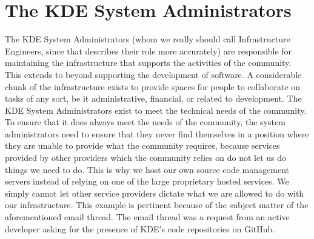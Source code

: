 \section*{The KDE System Administrators}
The KDE System Administrators (whom we really should call Infrastructure Engineers, since that describes their role more accurately) are responsible for maintaining the infrastructure that supports the activities of the community. This extends to beyond supporting the development of software. A considerable chunk of the infrastructure exists to provide spaces for people to collaborate on tasks of any sort, be it administrative, financial, or related to development. The KDE System Administrators exist to meet the technical needs of the community.
To ensure that it does always meet the needs of the community, the system administrators need to ensure that they never find themselves in a position where they are unable to provide what the community requires, because services provided by other providers which the community relies on do not let us do things we need to do. This is why we host our own source code management servers instead of relying on one of the large proprietary hosted services. We simply cannot let other service providers dictate what we are allowed to do with our infrastructure.
This example is pertinent because of the subject matter of the aforementioned email thread. The email thread was a request from an active developer asking for the presence of KDE’s code repositories on GitHub.

